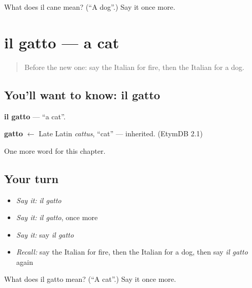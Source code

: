 \begin{tcolorbox}[breakable,colback=teal!4,colframe=teal!35!black,title={Before you move on}]
What does il cane mean? (\textquotedblleft{}A dog\textquotedblright{}.) Say it once more.
\end{tcolorbox}
\section[il gatto]{il gatto — a cat}

\label{lesson:IT-C68-gatto}



\begin{quote}
Before the new one: say the Italian for fire, then the Italian for a dog.
\end{quote}

\subsection*{You'll want to know: il gatto}
\textbf{il gatto} — \textquotedblleft{}a cat\textquotedblright{}.

\begin{cousinweb}
\textbf{gatto} $\leftarrow$ Late Latin \emph{cattus}, \textquotedblleft{}cat\textquotedblright{} — inherited. (EtymDB 2.1)
\end{cousinweb}

\begin{grammarlens}[title={What you've built}]
One more word for this chapter.
\end{grammarlens}

\subsection*{Your turn}
\begin{itemize}
\raggedright
  \item \emph{Say it:} \emph{il gatto}
  \item \emph{Say it:} \emph{il gatto}, once more
  \item \emph{Say it:} say \emph{il gatto}
  \item \emph{Recall:} say the Italian for fire, then the Italian for a dog, then say \emph{il gatto} again
\end{itemize}

\begin{tcolorbox}[breakable,colback=teal!4,colframe=teal!35!black,title={Before you move on}]
What does il gatto mean? (\textquotedblleft{}A cat\textquotedblright{}.) Say it once more.
\end{tcolorbox}
